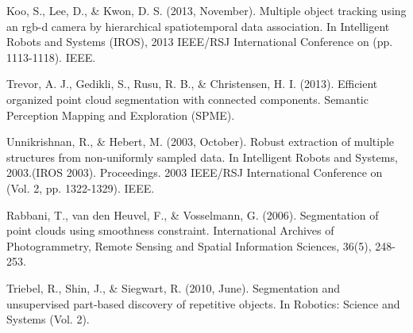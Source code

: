 \documentclass[twoside,hidelinks]{article}
\begin{document}
\begin{thebibliography}{9}






\newblock Koo, S., Lee, D., \& Kwon, D. S. (2013, November). Multiple object tracking using an rgb-d camera by hierarchical spatiotemporal data association. In Intelligent Robots and Systems (IROS), 2013 IEEE/RSJ International Conference on (pp. 1113-1118). IEEE.

\newblock Trevor, A. J., Gedikli, S., Rusu, R. B., \& Christensen, H. I. (2013). Efficient organized point cloud segmentation with connected components. Semantic Perception Mapping and Exploration (SPME).

\newblock Unnikrishnan, R., \& Hebert, M. (2003, October). Robust extraction of multiple structures from non-uniformly sampled data. In Intelligent Robots and Systems, 2003.(IROS 2003). Proceedings. 2003 IEEE/RSJ International Conference on (Vol. 2, pp. 1322-1329). IEEE. 

\newblock Rabbani, T., van den Heuvel, F., \& Vosselmann, G. (2006). Segmentation of point clouds using smoothness constraint. International Archives of Photogrammetry, Remote Sensing and Spatial Information Sciences, 36(5), 248-253.

\newblock Triebel, R., Shin, J., \& Siegwart, R. (2010, June). Segmentation and unsupervised part-based discovery of repetitive objects. In Robotics: Science and Systems (Vol. 2).


\end{thebibliography}
\end{document}
